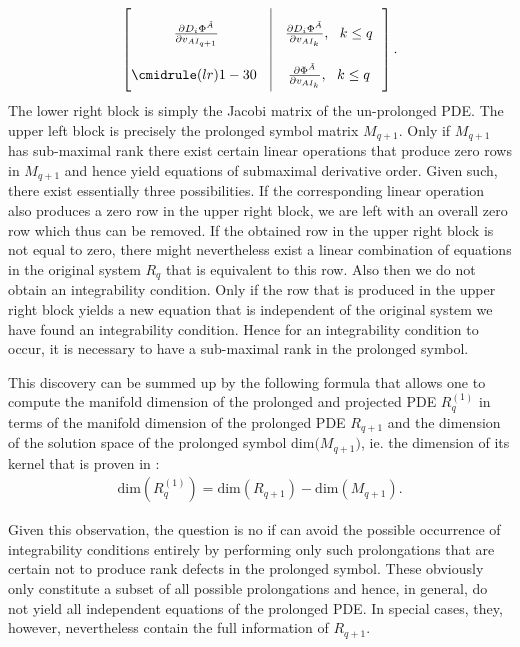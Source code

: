 \documentclass[a4paper,12pt, DIV=14, BCOR=5mm, twoside, headsepline, numbers=noenddot]{scrbook}
\begin{document}
\begin{align}
\def\arraystretch{2.5}
\begin{bmatrix}
      \ \ \frac{\partial D_i\Phi^{\tilde{A}}}{\partial v_{AI_{q+1}}} \ & \vline & \frac{\partial D_i \Phi^{\tilde{A}}}{\partial v_{AI_k}}, \ \ k \leq q \ \  \\
        \cmidrule(lr){1-3}
        0 & \vline & \frac{\partial \Phi^{\tilde{A}}}{\partial v_{AI_k}}, \ \ k \leq q \ \
\end{bmatrix}.
\end{align}
The lower right block is simply the Jacobi matrix of the un-prolonged PDE. The upper left block is precisely the prolonged symbol matrix $M_{q+1}$. Only if $M_{q+1}$ has sub-maximal rank there exist certain linear operations that produce zero rows in $M_{q+1}$ and hence yield equations of submaximal derivative order. Given such, there exist essentially three possibilities. If the corresponding linear operation also produces a zero row in the upper right block, we are left with an overall zero row which thus can be removed. If the obtained row in the upper right block is not equal to zero, there might nevertheless exist a linear combination of equations in the original system $R_q$ that is equivalent to this row. Also then we do not obtain an integrability condition. Only if the row that is produced in the upper right block yields a new equation that is independent of the original system we have found an integrability condition.  
Hence for an integrability condition to occur, it is necessary to have a sub-maximal rank in the prolonged symbol.

This discovery can be summed up by the following formula that allows one to compute the manifold dimension of the prolonged and projected PDE $R_q^{(1)}$ in terms of the manifold dimension of the prolonged PDE $R_{q+1}$ and the dimension of the solution space of the prolonged symbol $\mathrm{dim(}M_{q+1})$, ie. the dimension of its kernel that is proven in \cite{seiler1994analysis}:
\begin{align}
    \mathrm{dim}(R_{q}^{(1)}) = \mathrm{dim}(R_{q+1}) - \mathrm{dim}(M_{q+1}).
\end{align}

Given this observation, the question is no if can avoid the possible occurrence of integrability conditions entirely by performing only such prolongations that are certain not to produce rank defects in the prolonged symbol. These obviously only constitute a subset of all possible prolongations and hence, in general, do not yield all independent equations of the prolonged PDE. In special cases, they, however, nevertheless contain the full information of $R_{q+1}$.
\end{document}
